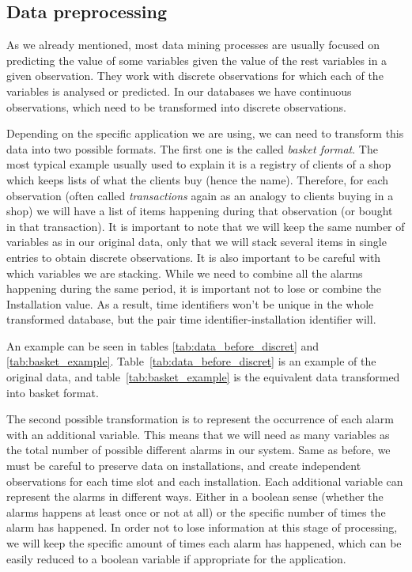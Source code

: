 \subsection{Data preprocessing}
As we already mentioned, most data mining processes are usually focused on predicting the value of some variables given the value of the rest variables in a given observation. They work with discrete observations for which each of the variables is analysed or predicted. In our databases we have continuous observations, which need to be transformed into discrete observations\cite{zaki2001spade}.

Depending on the specific application we are using, we can need to transform this data into two possible formats. The first one is the called \emph{basket format}. The most typical example usually used to explain it is a registry of clients of a shop which keeps lists of what the clients buy (hence the name). Therefore, for each observation (often called \emph{transactions} again as an analogy to clients buying in a shop) we will have a list of items happening during that observation (or bought in that transaction). It is important to note that we will keep the same number of variables as in our original data, only that we will stack several items in single entries to obtain discrete observations. It is also important to be careful with which variables we are stacking. While we need to combine all the alarms happening during the same period, it is important not to lose or combine the Installation value. As a result, time identifiers won't be unique in the whole transformed database, but the pair time 
identifier-installation identifier will.

An example can be seen in tables \ref{tab:data_before_discret} and \ref{tab:basket_example}. Table~\ref{tab:data_before_discret} is an example of the original data, and table~\ref{tab:basket_example} is the equivalent data transformed into basket format.

The second possible transformation is to represent the occurrence of each alarm with an additional variable. This means that we will need as many variables as the total number of possible different alarms in our system. Same as before, we must be careful to preserve data on installations, and create independent observations for each time slot and each installation. Each additional variable can represent the alarms in different ways. Either in a boolean sense (whether the alarms happens at least once or not at all) or the specific number of times the alarm has happened. In order not to lose information at this stage of processing, we will keep the specific amount of times each alarm has happened, which can be easily reduced to a boolean variable if appropriate for the application.

